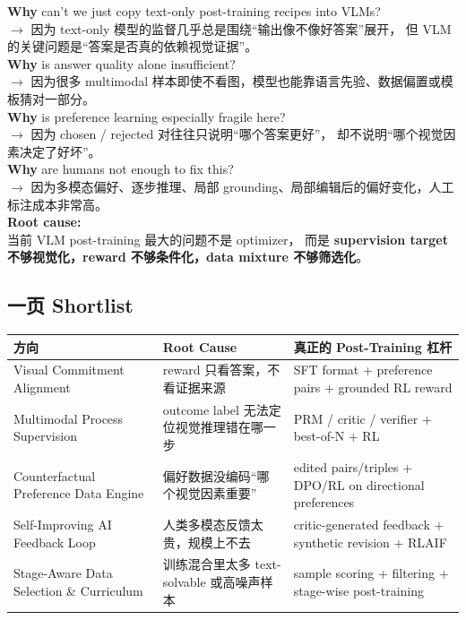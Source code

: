 \documentclass[12pt,a4paper]{article}
\begin{document}
\begin{whybox}
\textbf{Why} can't we just copy text-only post-training recipes into VLMs?\\
$\rightarrow$ 因为 text-only 模型的监督几乎总是围绕``输出像不像好答案''展开，
但 VLM 的关键问题是``答案是否真的依赖视觉证据''。\\[3pt]
\textbf{Why} is answer quality alone insufficient?\\
$\rightarrow$ 因为很多 multimodal 样本即使不看图，模型也能靠语言先验、数据偏置或模板猜对一部分。\\[3pt]
\textbf{Why} is preference learning especially fragile here?\\
$\rightarrow$ 因为 chosen / rejected 对往往只说明``哪个答案更好''，
却不说明``哪个视觉因素决定了好坏''。\\[3pt]
\textbf{Why} are humans not enough to fix this?\\
$\rightarrow$ 因为多模态偏好、逐步推理、局部 grounding、局部编辑后的偏好变化，人工标注成本非常高。\\[3pt]
\textbf{Root cause:}\\
当前 VLM post-training 最大的问题不是 optimizer，
而是 \textbf{supervision target 不够视觉化，reward 不够条件化，data mixture 不够筛选化}。
\end{whybox}

\subsection*{一页 Shortlist}

\renewcommand{\arraystretch}{1.25}
\begin{center}
\begin{tabular}{>{\raggedright\arraybackslash}p{3.2cm} >{\raggedright\arraybackslash}p{4.8cm} >{\raggedright\arraybackslash}p{4.6cm}}
\toprule
\textbf{方向} & \textbf{Root Cause} & \textbf{真正的 Post-Training 杠杆} \\
\midrule
Visual Commitment Alignment & reward 只看答案，不看证据来源 & SFT format + preference pairs + grounded RL reward \\
Multimodal Process Supervision & outcome label 无法定位视觉推理错在哪一步 & PRM / critic / verifier + best-of-N + RL \\
Counterfactual Preference Data Engine & 偏好数据没编码``哪个视觉因素重要'' & edited pairs/triples + DPO/RL on directional preferences \\
Self-Improving AI Feedback Loop & 人类多模态反馈太贵，规模上不去 & critic-generated feedback + synthetic revision + RLAIF \\
Stage-Aware Data Selection \& Curriculum & 训练混合里太多 text-solvable 或高噪声样本 & sample scoring + filtering + stage-wise post-training \\
\bottomrule
\end{tabular}
\end{center}
\end{document}
